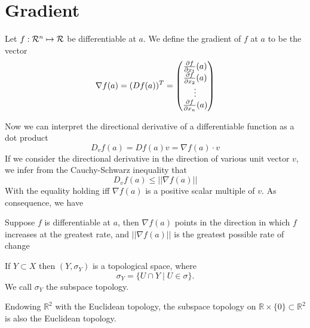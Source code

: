 \section{Gradient}
\begin{definition}
    Let $f: \mathcal{R}^{n} \mapsto \mathcal{R}$ be differentiable at $a$. We define the gradient of $f$ at $a$ to be the vector
    $$\nabla f(a) = (Df(a))^T = \begin{pmatrix}\pdv{f}{x_{1}}(a)\\\pdv{f}{x_{2}}(a)\\ \vdots\\\pdv{f}{x_{n}}(a)\end{pmatrix}$$
\end{definition}
Now we can interpret the directional derivative of a differentiable function as a dot product
$$D_{v}f(a) = Df(a)v = \nabla f(a) \cdot v$$
If we consider the directional derivative in the direction of various unit vector $v$, we infer from the Cauchy-Schwarz inequality that 
$$D_{v}f(a) \leq ||\nabla f(a)||$$
With the equality holding iff $\nabla f(a)$ is a positive scalar multiple of $v$.
As consequence, we have
\begin{prop}
    Suppose $f$ is differentiable at $a$, then $\nabla f(a)$ points in the direction in which $f$ increases at the greatest rate, and $||\nabla f(a)||$ is the greatest possible rate of change
\end{prop}
\begin{definition}
    If $Y \subset X$ then $(Y, \sigma_Y)$ is a topological space, where
    \[
    \sigma_Y = \{U \cap Y  \mid  U \in \sigma\} 
    .\]  We call $\sigma_Y$ the subspace topology.
\end{definition}
\begin{eg}
Endowing $\mathbb{R}^2$ with the Euclidean topology,
the subspace topology on    $\mathbb R \times \{0\}\subset \mathbb{R}^2$ is also the
 Euclidean topology.
\end{eg}

